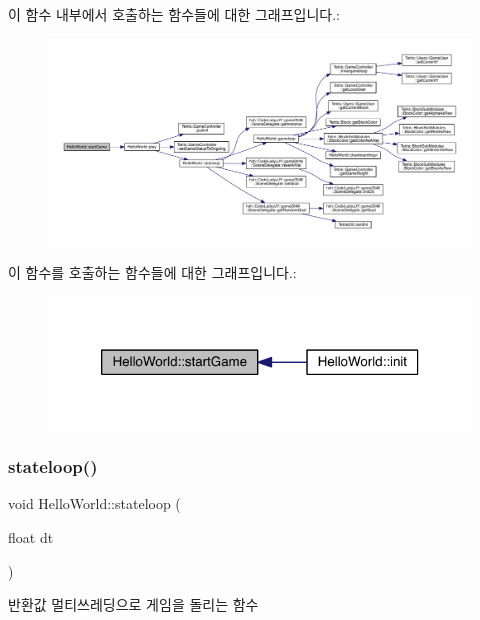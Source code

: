 이 함수 내부에서 호출하는 함수들에 대한 그래프입니다.\+:
\nopagebreak
\begin{figure}[H]
\begin{center}
\leavevmode
\includegraphics[width=350pt]{class_hello_world_aa4c36099096e160e3726819a2308dd04_cgraph}
\end{center}
\end{figure}
이 함수를 호출하는 함수들에 대한 그래프입니다.\+:
\nopagebreak
\begin{figure}[H]
\begin{center}
\leavevmode
\includegraphics[width=318pt]{class_hello_world_aa4c36099096e160e3726819a2308dd04_icgraph}
\end{center}
\end{figure}
\mbox{\label{class_hello_world_a4ab71b15b7e362af143d2a539e39a538}} 
\subsubsection{\texorpdfstring{stateloop()}{stateloop()}}
{\footnotesize\ttfamily void Hello\+World\+::stateloop (\begin{DoxyParamCaption}\item[{float}]{dt }\end{DoxyParamCaption})\hspace{0.3cm}{\ttfamily [protected]}}

\begin{DoxyReturn}{반환값}
멀티쓰레딩으로 게임을 돌리는 함수 
\end{DoxyReturn}


